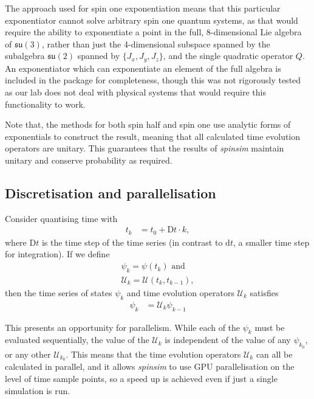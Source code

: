 \documentclass{jors}
\begin{document}
		The approach used for spin one exponentiation means that this particular exponentiator cannot solve arbitrary spin one quantum systems, as that would require the ability to exponentiate a point in the full, 8-dimensional Lie algebra of \(\mathfrak{su}(3)\), rather than just the 4-dimensional subspace spanned by the subalgebra \(\mathfrak{su}(2)\) spanned by \(\{J_x, J_y, J_z\}\), and the single quadratic operator \(Q\).
		An exponentiator which can exponentiate an element of the full algebra is included in the package for completeness, though this was not rigorously tested as our lab does not deal with physical systems that would require this functionality to work.

		Note that, the methods for both spin half and spin one use analytic forms of exponentials to construct the result, meaning that all calculated time evolution operators are unitary.
		This guarantees that the results of \emph{spinsim} maintain unitary and conserve probability as required.

	\subsection{Discretisation and parallelisation}
		Consider quantising time with
		\begin{align}
			t_k &= t_0 + \mathrm{D}t\cdot k,
		\end{align}
		where \(\mathrm{D}t\) is the time step of the time series (in contrast to \(\mathrm{d}t\), a smaller time step for integration).
		If we define
		\begin{align}
			\psi_k = \psi(t_k)\textrm{ and}\\
			\mathcal{U}_k = \mathcal{U}(t_{k}, t_{k-1}),
		\end{align}
		then the time series of states \(\psi_k\) and time evolution operators \(\mathcal{U}_k\) satisfies
		\begin{align}
			\psi_k &= \mathcal{U}_k\psi_{k-1}\label{eq:integration_compilation}
		\end{align}

		This presents an opportunity for parallelism.
		While each of the \(\psi_k\) must be evaluated sequentially, the value of the \(\mathcal{U}_k\) is independent of the value of any \(\psi_{k_0}\), or any other \(\mathcal{U}_{k_0}\).
		This means that the time evolution operators \(\mathcal{U}_k\) can all be calculated in parallel, and it allows \emph{spinsim} to use GPU parallelisation on the level of time sample points, so a speed up is achieved even if just a single simulation is run.
\end{document}
